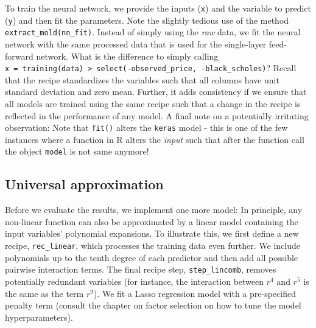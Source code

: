 \documentclass[
]{book}
\newenvironment{Shaded}{\begin{snugshade}}{\end{snugshade}}
\newcommand{\AttributeTok}[1]{\textcolor[rgb]{0.61,0.61,0.61}{#1}}
\newcommand{\ConstantTok}[1]{\textcolor[rgb]{0,0,0}{#1}}
\newcommand{\DecValTok}[1]{\textcolor[rgb]{0.06,0.06,0.06}{#1}}
\newcommand{\ErrorTok}[1]{\textcolor[rgb]{0.14,0.14,0.14}{\textbf{#1}}}
\newcommand{\FunctionTok}[1]{\textcolor[rgb]{0,0,0}{#1}}
\newcommand{\NormalTok}[1]{#1}
\newcommand{\SpecialCharTok}[1]{\textcolor[rgb]{0,0,0}{#1}}
\begin{document}
To train the neural network, we provide the inputs (\texttt{x}) and the variable to predict (\texttt{y}) and then fit the parameters. Note the slightly tedious use of the method \texttt{extract\_mold(nn\_fit)}. Instead of simply using the \emph{raw} data, we fit the neural network with the same processed data that is used for the single-layer feed-forward network. What is the difference to simply calling \texttt{x\ =\ training(data)\ \textbar{}\textgreater{}\ select(-observed\_price,\ -black\_scholes)}? Recall that the recipe standardizes the variables such that all columns have unit standard deviation and zero mean. Further, it adds consistency if we ensure that all models are trained using the same recipe such that a change in the recipe is reflected in the performance of any model. A final note on a potentially irritating observation: Note that \texttt{fit()} alters the \texttt{keras} model - this is one of the few instances where a function in R alters the \emph{input} such that after the function call the object \texttt{model} is not same anymore!

\begin{Shaded}
\end{Shaded}

\hypertarget{universal-approximation}{%
\subsection{Universal approximation}\label{universal-approximation}}

Before we evaluate the results, we implement one more model: In principle, any non-linear function can also be approximated by a linear model containing the input variables' polynomial expansions. To illustrate this, we first define a new recipe, \texttt{rec\_linear}, which processes the training data even further. We include polynomials up to the tenth degree of each predictor and then add all possible pairwise interaction terms. The final recipe step, \texttt{step\_lincomb}, removes potentially redundant variables (for instance, the interaction between \(r^4\) and \(r^5\) is the same as the term \(r^9\)). We fit a Lasso regression model with a pre-specified penalty term (consult the chapter on factor selection on how to tune the model hyperparameters).
\end{document}
